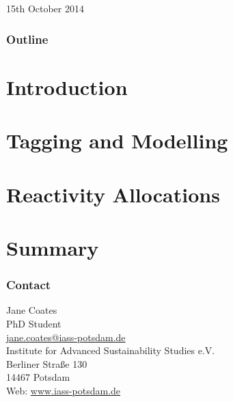\documentclass[center]{beamer}
\begin{document}


\begin{frame} %
    \vspace{3cm}
    {\Large \textcolor{\highlightcolor}{\textbf{\slidesettitle}}}\\ 
    \vspace{1cm}
    {\Large \textcolor{GreyIASS}{\textbf{\authorname}}} \\
    \vspace{.5cm}
    {\large \textcolor{GreyIASS}{15th October 2014}} 
\end{frame}



\begin{frame}
    \frametitle{Outline}
    \tableofcontents 
\end{frame}
\centering
\section{Introduction}


\section{Tagging and Modelling}
 

\section{Reactivity Allocations}


\section{Summary}


\begin{frame} %
    \frametitle{Contact}

    \begin{flushleft}
        \textcolor{BlueIASS} {
            Jane Coates\\
            PhD Student\\
            \href{mailto:jane.coates@iass-potsdam.de}{jane.coates@iass-potsdam.de} \\ \vspace{5mm}
            Institute for Advanced Sustainability Studies e.V. \\
            Berliner Stra{\ss}e 130 \\
            14467 Potsdam \\
            Web: \url{www.iass-potsdam.de}
        }
    \end{flushleft}

\end{frame}

% 
\end{document}
